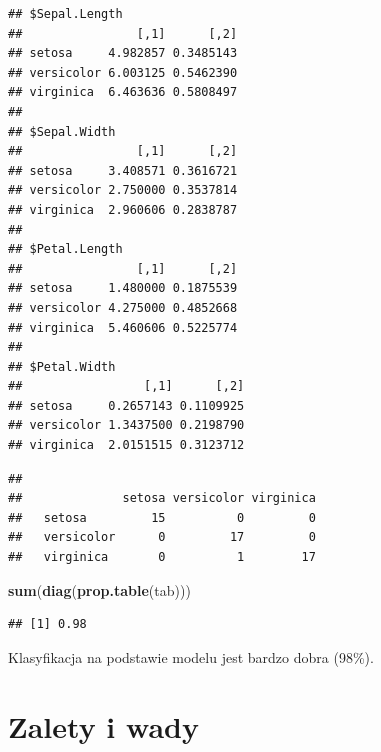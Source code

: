 \documentclass[
]{book}
\newenvironment{Shaded}{\begin{snugshade}}{\end{snugshade}}
\newcommand{\DataTypeTok}[1]{\textcolor[rgb]{0.13,0.29,0.53}{#1}}
\newcommand{\KeywordTok}[1]{\textcolor[rgb]{0.13,0.29,0.53}{\textbf{#1}}}
\newcommand{\NormalTok}[1]{#1}
\newcommand{\OperatorTok}[1]{\textcolor[rgb]{0.81,0.36,0.00}{\textbf{#1}}}
\newcommand{\StringTok}[1]{\textcolor[rgb]{0.31,0.60,0.02}{#1}}
\theoremstyle{plain}
\theoremstyle{definition}
\theoremstyle{definition}
\theoremstyle{definition}
\theoremstyle{definition}
\theoremstyle{remark}
\begin{document}
\begin{verbatim}
## $Sepal.Length
##                [,1]      [,2]
## setosa     4.982857 0.3485143
## versicolor 6.003125 0.5462390
## virginica  6.463636 0.5808497
## 
## $Sepal.Width
##                [,1]      [,2]
## setosa     3.408571 0.3616721
## versicolor 2.750000 0.3537814
## virginica  2.960606 0.2838787
## 
## $Petal.Length
##                [,1]      [,2]
## setosa     1.480000 0.1875539
## versicolor 4.275000 0.4852668
## virginica  5.460606 0.5225774
## 
## $Petal.Width
##                 [,1]      [,2]
## setosa     0.2657143 0.1109925
## versicolor 1.3437500 0.2198790
## virginica  2.0151515 0.3123712
\end{verbatim}

\begin{Shaded}
\end{Shaded}

\begin{verbatim}
##             
##              setosa versicolor virginica
##   setosa         15          0         0
##   versicolor      0         17         0
##   virginica       0          1        17
\end{verbatim}

\begin{Shaded}
\begin{Highlighting}[]
\KeywordTok{sum}\NormalTok{(}\KeywordTok{diag}\NormalTok{(}\KeywordTok{prop.table}\NormalTok{(tab)))}
\end{Highlighting}
\end{Shaded}

\begin{verbatim}
## [1] 0.98
\end{verbatim}

Klasyfikacja na podstawie modelu jest bardzo dobra (98\%).

\hypertarget{zalety-i-wady-1}{%
\section{Zalety i wady}\label{zalety-i-wady-1}}
\end{document}
